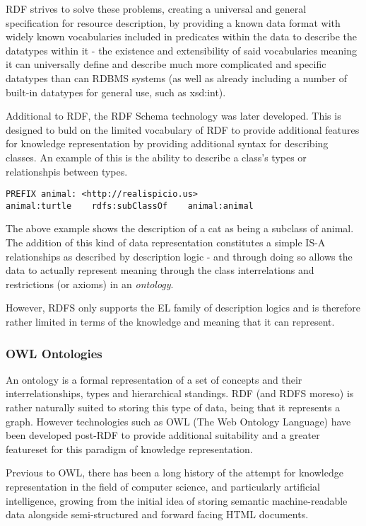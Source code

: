 \documentclass{article}
\begin{document}
RDF strives to solve these problems, creating a universal and general
specification for resource description, by providing a known data format with
widely known vocabularies included in predicates within the data to describe 
the datatypes within it - the existence and extensibility of said vocabularies 
meaning it can universally define and describe much more complicated and 
specific datatypes than can RDBMS systems (as well as already including a number
of built-in datatypes for general use, such as xsd:int).

Additional to RDF, the RDF Schema technology was later developed. This is
designed to buld on the limited vocabulary of RDF to provide additional features
for knowledge representation by providing additional syntax for describing
classes. An example of this is the ability to describe a class's types or
relationshpis between types.

\begin{lstlisting}
PREFIX animal: <http://realispicio.us>
animal:turtle    rdfs:subClassOf    animal:animal
\end{lstlisting}

The above example shows the description of a cat as being a subclass of animal.
The addition of this kind of data representation constitutes a simple IS-A
relationships as described by description logic\cite{desclogic} - and through 
doing so allows the data to actually represent meaning through the class 
interrelations and restrictions (or axioms) in an \emph{ontology}.

However, RDFS only supports the EL family of description logics and is therefore
rather limited in terms of the knowledge and meaning that it can represent. 

\subsubsection{OWL Ontologies}

An ontology is a formal representation of a set of concepts and their
interrelationships, types and hierarchical standings. RDF (and RDFS moreso) is
rather naturally suited to storing this type of data, being that it represents 
a graph. However technologies such as OWL (The Web Ontology Language) have been 
developed post-RDF to provide additional suitability and a greater featureset 
for this paradigm of knowledge representation.

Previous to OWL, there has been a long history of the attempt for knowledge
representation in the field of computer science, and particularly
artificial intelligence, growing from the initial idea of storing semantic
machine-readable data alongside semi-structured and forward facing HTML
documents. 
\end{document}
